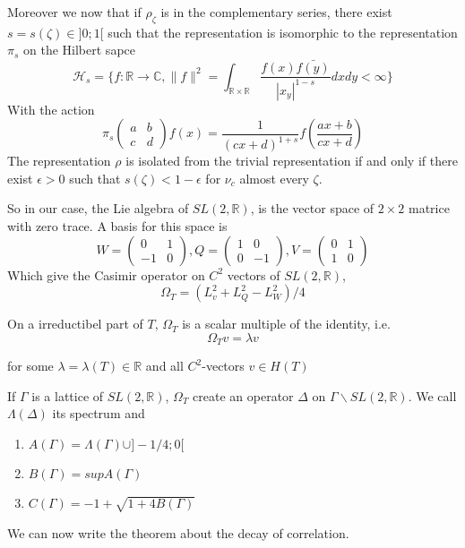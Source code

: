 Moreover we now that if $\rho_\zeta$ is in the complementary series, there exist $s=s(\zeta) \in ]0;1[$ such that the representation is isomorphic to the representation $\pi_s$ on the Hilbert sapce \[
\mathcal{H}_s =
\{ f:\mathbb{R} \to \mathbb{C}
, \|f \|^2 = \int_{\mathbb{R} \times \mathbb{R}}
 \frac{f(x) \bar{f(y)}}{|x_y|^{1-s}}dxdy < \infty\}
\]
With the action \[
\pi_s \begin{pmatrix}a & b \\c & d \end{pmatrix}f(x)=\frac{1}{(cx+d)^{1+s}}f(\frac{ax+b}{cx+d})
\]
The representation $\rho$ is isolated from the trivial representation if and only if there exist $\epsilon >0$ such that $s(\zeta)<1-\epsilon$ for $\nu_c$ almost every $\zeta$.


So in our case, the Lie algebra of $SL(2,\mathbb{R})$, is the vector space of $2 \times 2$ matrice with zero trace. A basis for this space is \[
W=\begin{pmatrix} 0 & 1 \\ -1 & 0 \end{pmatrix}, Q=\begin{pmatrix} 1 & 0 \\ 0 & -1 \end{pmatrix}, V=\begin{pmatrix} 0 & 1 \\ 1 & 0 \end{pmatrix}
\]
Which give the Casimir operator on $C^2$ vectors of $SL(2,\mathbb{R})$, \[
\Omega_T = (L_v^2+L_Q^2-L_W^2)/4
\]

On a irreductibel part of $T$, $\Omega_T$ is a scalar multiple of the identity, i.e. \[
\Omega_T v = \lambda v
\]

for some $\lambda=\lambda(T)\in \mathbb{R}$ and all $C^2$-vectors $v \in H(T)$

If $\Gamma$ is a lattice of $SL(2,\mathbb{R})$, $\Omega_T$ create an operator $\Delta$ on $\Gamma \backslash SL(2,\mathbb{R})$. We call $\Lambda(\Delta)$ its spectrum and
\begin{enumerate}
\item $A(\Gamma)=\Lambda(\Gamma) \cup ]-1/4;0[$
\item $B(\Gamma)=sup A(\Gamma)$
\item $C(\Gamma)= -1 + \sqrt{1+4 B(\Gamma)}$
\end{enumerate}

We can now write the theorem about the decay of correlation.

